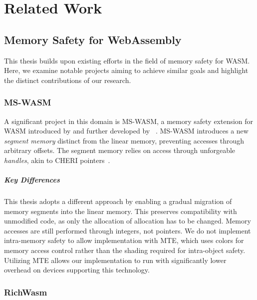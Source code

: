 \chapter{Related Work}
\label{ch:related}

\section{Memory Safety for WebAssembly}
\label{sec:related-memory-safety-for-webassembly}

This thesis builds upon existing efforts in the field of memory safety for \ac{WASM}.
Here, we examine notable projects aiming to achieve similar goals and highlight the distinct contributions of our research.

\subsection{MS-WASM}
\label{subsec:ms-wasm}

A significant project in this domain is MS-WASM, a memory safety extension for WASM introduced by \citeauthor*{disselkoen2019position} and further developed by \citeauthor*{michael2023mswasm}~\cite{disselkoen2019position,michael2023mswasm}.
MS-WASM introduces a new \textit{segment memory} distinct from the linear memory, preventing accesses through arbitrary offsets.
The segment memory relies on access through unforgeable \textit{handles}, akin to CHERI pointers~\cite{woodruff2014cheri}.

\paragraph{Key Differences}
This thesis adopts a different approach by enabling a gradual migration of memory segments into the linear memory.
This preserves compatibility with unmodified code, as only the allocation of allocation has to be changed.
Memory accesses are still performed through integers, not pointers.
We do not implement intra-memory safety to allow implementation with \ac{MTE}, which uses colors for memory access control rather than the shading required for intra-object safety.
Utilizing \ac{MTE} allows our implementation to run with significantly lower overhead on devices supporting this technology.

\subsection{RichWasm}
\label{subsec:richwasm}

